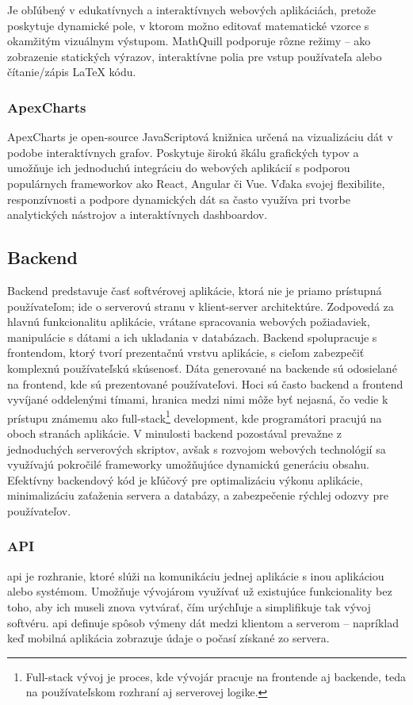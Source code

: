 Je obľúbený v edukatívnych a interaktívnych webových aplikáciách, pretože poskytuje dynamické pole, v ktorom možno editovať matematické vzorce s okamžitým vizuálnym výstupom. 
MathQuill podporuje rôzne režimy – ako zobrazenie statických výrazov, interaktívne polia pre vstup používateľa alebo čítanie/zápis LaTeX kódu.\cite{mathquill}\cite{aipreklad}
\subsubsection{ApexCharts}
ApexCharts je open-source JavaScriptová knižnica určená na vizualizáciu dát v podobe interaktívnych grafov.
 Poskytuje širokú škálu grafických typov a umožňuje ich jednoduchú integráciu do webových aplikácií s podporou populárnych frameworkov ako React, Angular či Vue. 
Vďaka svojej flexibilite, responzívnosti a podpore dynamických dát sa často využíva pri tvorbe analytických nástrojov a interaktívnych dashboardov.\cite{apexcharts}\cite{aipreklad}

\subsection{Backend}
Backend predstavuje časť softvérovej aplikácie, ktorá nie je priamo prístupná používateľom; ide o serverovú stranu v klient-server architektúre.
 Zodpovedá za hlavnú funkcionalitu aplikácie, vrátane spracovania webových požiadaviek, manipulácie s dátami a ich ukladania v databázach. Backend spolupracuje s frontendom, ktorý tvorí prezentačnú vrstvu aplikácie, s cieľom zabezpečiť komplexnú používateľskú skúsenosť. 
 Dáta generované na backende sú odosielané na frontend, kde sú prezentované používateľovi.
  Hoci sú často backend a frontend vyvíjané oddelenými tímami, hranica medzi nimi môže byť nejasná, čo vedie k prístupu známemu ako full-stack\footnote{Full-stack vývoj je proces, kde vývojár pracuje na frontende aj backende, teda na používateľskom rozhraní aj serverovej logike.} development, kde programátori pracujú na oboch stranách aplikácie.
   V minulosti backend pozostával prevažne z jednoduchých serverových skriptov, avšak s rozvojom webových technológií sa využívajú pokročilé frameworky umožňujúce dynamickú generáciu obsahu.
 Efektívny backendový kód je kľúčový pre optimalizáciu výkonu aplikácie, minimalizáciu zaťaženia servera a databázy, a zabezpečenie rýchlej odozvy pre používateľov. \cite{backend} 
 \subsubsection{API}
 \acrfull{api} je rozhranie, ktoré slúži na komunikáciu jednej aplikácie s inou aplikáciou alebo systémom.
 Umožňuje vývojárom využívať už existujúce funkcionality bez toho, aby ich museli znova vytvárať, čím urýchľuje a simplifikuje tak vývoj softvéru.
  \acrshort{api} definuje spôsob výmeny dát medzi klientom a serverom – napríklad keď mobilná aplikácia zobrazuje údaje o počasí získané zo servera.\cite{api}
